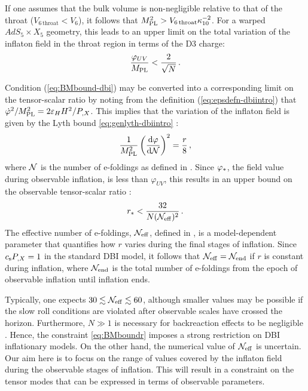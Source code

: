 If one assumes that the bulk volume is 
non-negligible relative to 
that of the throat ($V_{6\,\mathrm{throat}} < V_{6}$), 
it follows that $M_{\mathrm{PL}}^2> V_{6\,\mathrm{throat}}\kappa_{10}^{-2}$. 
For a warped $AdS_5 \times X_5$ geometry, this leads to an 
upper limit on the total variation of the inflaton field in 
the throat region in terms of the D3 charge:
% 
\begin{equation}
\label{eq:BMbound-dbi}
\frac{\varphi_{UV}}{M_{\mathrm{PL}}}   < \frac{2}{\sqrt{N}} \,.
\end{equation}
% 


Condition (\ref{eq:BMbound-dbi}) may be converted into a 
corresponding limit on the tensor-scalar ratio by noting from 
the definition (\ref{eq:epsdefn-dbiintro})
that $\dot{\varphi}^2 /M_{\mathrm{PL}}^2 = 2\varepsilon_H H^2/P_{,X}$.
This implies that the variation of the inflaton field 
is given by the Lyth bound \eqref{eq:genlyth-dbiintro} 
\cite{lyth,bmpaper}:
% 
\begin{equation}
\label{eq:rtheory}
\frac{1}{M_{\mathrm{PL}}^2} \left( \frac{\mathrm{d}\varphi}{\mathrm{d} \mathcal{N}} \right)^2 =
\frac{r}{8} \,,
\end{equation}
% 
where $\mathcal{N}$ is the number of e-foldings as defined in . 
Since $\varphi_*$, the field value during observable inflation,  is
less than $\varphi_{UV}$,
this results in an upper bound on the observable tensor-scalar ratio
\cite{bmpaper}: 
% 
\begin{equation}
\label{eq:BMboundr}
r_*  < \frac{32}{N (\mathcal{N}_\mathrm{eff})^2} \,.
\end{equation}
% 
The effective number of e-foldings, $\mathcal{N}_\mathrm{eff}$, defined in
, 
is a model-dependent parameter that quantifies 
how $r$ varies during the final stages of inflation. Since $c_\mathrm{s}P_{,X} = 1$ in the
standard DBI model, 
it follows that $\mathcal{N}_\mathrm{eff} = \mathcal{N}_\mathrm{end}$ if $r$ is constant during inflation,
where $\mathcal{N}_\mathrm{end}$ is the total number of e-foldings
from the epoch of observable inflation until inflation ends.


Typically, one expects $30 \lesssim {\ensuremath{\mathcal{N}_\mathrm{eff}}} \lesssim 60$, 
although smaller values may be possible if the slow roll conditions are 
violated after observable scales have crossed the horizon. 
Furthermore, $N \gg 1$ is necessary 
for backreaction effects to be negligible \cite{bmpaper}. 
Hence, the constraint \eqref{eq:BMboundr} 
imposes a strong restriction on DBI inflationary models. 
On the other hand, the numerical value 
of $\mathcal{N}_\mathrm{eff}$ is uncertain.  
Our aim here is to focus on the range of values covered by the 
inflaton field during the observable stages of inflation. 
This will result in a constraint on the tensor modes that 
can be expressed in terms of observable parameters.  


